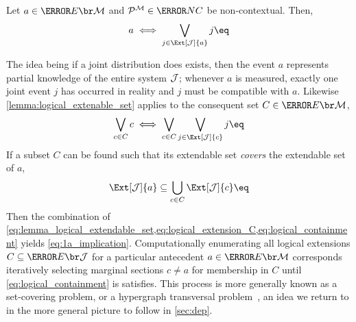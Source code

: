 \documentclass[aps, 10pt, english, twoside, pra, nofootinbib, longbibliography]{revtex4-1}
\begin{document}
    \begin{lemma}
        \label{lemma:logical_extenable_set}
        Let $a \in \Events{\mscenario}$ and $\probvec^{\mscenario} \in \s{NC}$ be non-contextual. Then,
        \[ a \iff \bigvee_{j \in \Ext[\jointvar]{a}} j \eq \label{eq:lemma_logical_extendable_set}\]
    \end{lemma}
    The idea being if a joint distribution does exists, then the event $a$ represents partial knowledge of the entire system $\mathcal{J}$; whenever $a$ is measured, exactly one joint event $j$ has occurred in reality and $j$ must be compatible with $a$. Likewise \cref{lemma:logical_extenable_set} applies to the consequent set $C \in \Events{\mscenario}$,
    \[ \bigvee_{c \in C} c \iff \bigvee_{c \in C} \bigvee_{j \in \Ext[\jointvar]{c}} j \eq \label{eq:logical_extension_C}\]
    If a subset $C$ can be found such that its extendable set \textit{covers} the extendable set of $a$,
    \[ \Ext[\jointvar]{a} \subseteq \bigcup_{c \in C} \Ext[\jointvar]{c} \eq \label{eq:logical_containment} \]
    Then the combination of \cref{eq:lemma_logical_extendable_set,eq:logical_extension_C,eq:logical_containment} yields \cref{eq:1a_implication}.  Computationally enumerating all logical extensions $C \subseteq \Events{\jointvar}$ for a particular antecedent $a \in \Events{\mscenario}$ corresponds iteratively selecting marginal sections $c \neq a$ for membership in $C$ until \cref{eq:logical_containment} is satisfies. This process is more generally known as a set-covering problem, or a hypergraph transversal problem~\cite{Inflation}, an idea we return to in the more general picture to follow in \cref{sec:dep}. \\
\end{document}
